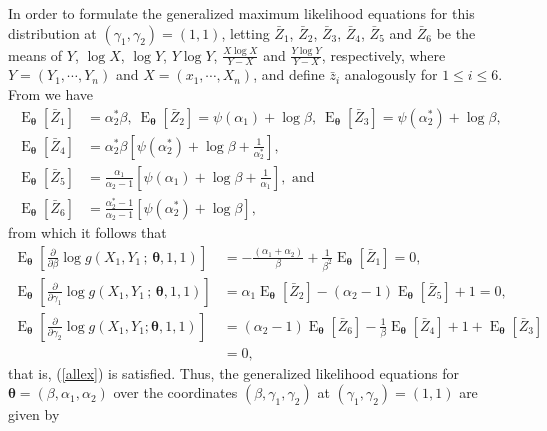 \documentclass[10pt,a4paper,onecolumn]{article} %
\newcommand{\bs}{\boldsymbol}
\newcommand{\on}{\operatorname}
\begin{document}
In order to formulate the generalized maximum likelihood equations for this distribution at $(\gamma_1,\gamma_2)=(1,1)$, letting $\bar{Z}_1$, $\bar{Z}_2$, $\bar{Z}_3$, $\bar{Z}_4$, $\bar{Z}_5$ and $\bar{Z}_6$ be the means of $Y$, $\log X$, $\log Y$, $Y\log Y$, $\frac{X \log X}{Y-X}$ and $\frac{Y \log Y}{Y-X}$, respectively, where $Y=(Y_1,\cdots,Y_n)$ and $X=(x_1,\cdots,X_n)$, and define $\bar{z}_i$ analogously for $1\leq i\leq 6$. From \cite{2022-Zhao} we have
\begin{equation}\label{relations3}
\begin{aligned}
\on{E}_{\bs{\theta}}\left[\bar{Z}_1\right] &= \alpha_2^*\beta,\ 
\on{E}_{\bs{\theta}}\left[\bar{Z}_2\right] = \psi(\alpha_1) + \log \beta,\ \on{E}_{\bs{\theta}}\left[\bar{Z}_3\right] = \psi(\alpha_2^*) + \log \beta,\\ 
\on{E}_{\bs{\theta}}\left[\bar{Z}_4\right] &= \alpha_2^*\beta \left[\psi(\alpha_2^*) + \log \beta + \frac{1}{\alpha_2^*}\right],\\
\on{E}_{\bs{\theta}}\left[\bar{Z}_5\right] &= \frac{\alpha_1}{\alpha_2 - 1}\left[\psi(\alpha_1) + \log \beta + \frac{1}{\alpha_1}\right],\mbox{ and}\\
\on{E}_{\bs{\theta}}\left[\bar{Z}_6\right] &= \frac{\alpha_2^*-1}{\alpha_2 - 1}\left[\psi(\alpha_2^*) + \log \beta\right],
\end{aligned}
\end{equation}
from which it follows that
\begin{equation*}
    \begin{aligned}
\on{E}_{\bs{\theta}} \left[\frac{\partial}{\partial \beta}  \log g(X_1,Y_1\,;\,\bs{\theta},1,1)\right] &= -\frac{(\alpha_1 + \alpha_2)}{\beta} + \frac{1}{\beta^2} \on{E}_{\bs{\theta}}[\bar{Z}_1] = 0, \\
\on{E}_{\bs{\theta}} \left[\frac{\partial}{\partial \gamma_1}  \log g(X_1,Y_1\,;\,\bs{\theta},1,1)\right] &= \alpha_1 \on{E}_{\bs{\theta}}[ \bar{Z}_2] - (\alpha_2 - 1) \on{E}_{\bs{\theta}}\left[\bar{Z}_5\right] + 1 = 0, \\
\on{E}_{\bs{\theta}} \left[\frac{\partial}{\partial \gamma_2}  \log g(X_1,Y_1;\bs{\theta},1,1)\right] &= (\alpha_2 - 1) \on{E}_{\bs{\theta}}\left[\bar{Z}_6\right] - \frac{1}{\beta} \on{E}_{\bs{\theta}}\left[\bar{Z}_4\right] + 1 + \on{E}_{\bs{\theta}}\left[\bar{Z}_3\right] \\ &=0,
\end{aligned}
\end{equation*}
that is, (\ref{allex}) is satisfied. Thus, the generalized likelihood equations for $\bs{\theta}=(\beta,\alpha_1,\alpha_2)$ over the coordinates $(\beta, \gamma_1,\gamma_2)$ at $(\gamma_1,\gamma_2)=(1,1)$ are given by
\end{document}
